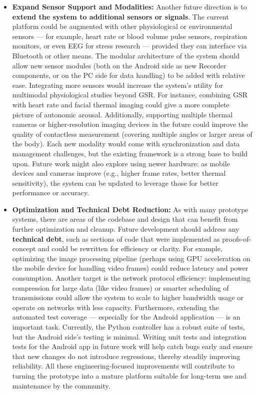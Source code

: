\documentclass[11pt,a4paper]{report}
\begin{document}
\begin{itemize}
\item \textbf{Expand Sensor Support and Modalities:} Another future direction is
  to \textbf{extend the system to additional sensors or signals}. The current
  platform could be augmented with other physiological or environmental
  sensors --- for example, heart rate or blood volume pulse sensors,
  respiration monitors, or even EEG for stress research --- provided they
  can interface via Bluetooth or other means. The modular architecture
  of the system should allow new sensor modules (both on the Android
  side as new Recorder components, or on the PC side for data handling)
  to be added with relative ease. Integrating more sensors would
  increase the system's utility for multimodal physiological studies
  beyond GSR. For instance, combining GSR with heart rate and facial
  thermal imaging could give a more complete picture of autonomic
  arousal. Additionally, supporting multiple thermal cameras or
  higher-resolution imaging devices in the future could improve the
  quality of contactless measurement (covering multiple angles or larger
  areas of the body). Each new modality would come with synchronization
  and data management challenges, but the existing framework is a strong
  base to build upon. Future work might also explore using newer
  hardware: as mobile devices and cameras improve (e.g., higher frame
  rates, better thermal sensitivity), the system can be updated to
  leverage those for better performance or accuracy.

\item \textbf{Optimization and Technical Debt Reduction:} As with many prototype
  systems, there are areas of the codebase and design that can benefit
  from further optimization and cleanup. Future development should
  address any \textbf{technical debt}, such as sections of code that were
  implemented as proofs-of-concept and could be rewritten for efficiency
  or clarity. For example, optimizing the image processing pipeline
  (perhaps using GPU acceleration on the mobile device for handling
  video frames) could reduce latency and power consumption. Another
  target is the network protocol efficiency: implementing compression
  for large data (like video frames) or smarter scheduling of
  transmissions could allow the system to scale to higher bandwidth
  usage or operate on networks with less capacity. Furthermore,
  extending the automated test coverage --- especially for the Android
  application --- is an important task. Currently, the Python controller
  has a robust suite of tests, but the Android side's testing is
  minimal. Writing unit tests and integration tests for the Android app
  in future work will help catch bugs early and ensure that new changes
  do not introduce regressions, thereby steadily improving reliability.
  All these engineering-focused improvements will contribute to turning
  the prototype into a mature platform suitable for long-term use and
  maintenance by the community.


\end{itemize}
\end{document}
